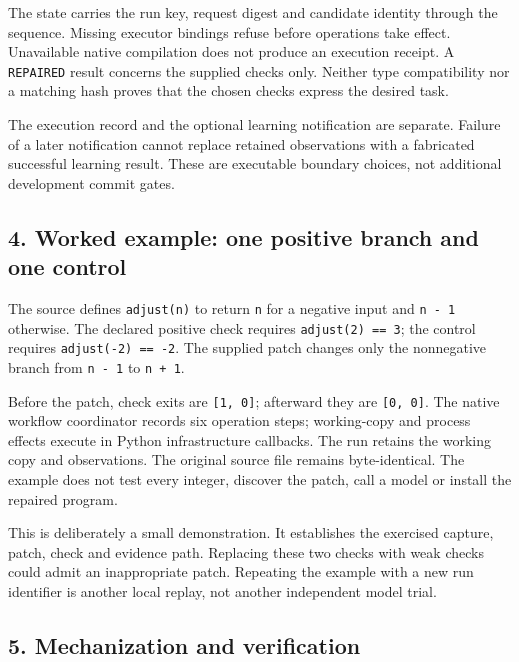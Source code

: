 \documentclass[
  11pt,
]{article}
\newcommand{\passthrough}[1]{#1}
\begin{document}
The state carries the run key, request digest and candidate identity
through the sequence. Missing executor bindings refuse before operations
take effect. Unavailable native compilation does not produce an
execution receipt. A \passthrough{\lstinline!REPAIRED!} result concerns
the supplied checks only. Neither type compatibility nor a matching hash
proves that the chosen checks express the desired task.

The execution record and the optional learning notification are
separate. Failure of a later notification cannot replace retained
observations with a fabricated successful learning result. These are
executable boundary choices, not additional development commit gates.

\subsection{4. Worked example: one positive branch and one
control}\label{worked-example-one-positive-branch-and-one-control}

The source defines \passthrough{\lstinline!adjust(n)!} to return
\passthrough{\lstinline!n!} for a negative input and
\passthrough{\lstinline!n - 1!} otherwise. The declared positive check
requires \passthrough{\lstinline!adjust(2) == 3!}; the control requires
\passthrough{\lstinline!adjust(-2) == -2!}. The supplied patch changes
only the nonnegative branch from \passthrough{\lstinline!n - 1!} to
\passthrough{\lstinline!n + 1!}.

Before the patch, check exits are \passthrough{\lstinline![1, 0]!};
afterward they are \passthrough{\lstinline![0, 0]!}. The native workflow
coordinator records six operation steps; working-copy and process
effects execute in Python infrastructure callbacks. The run retains the
working copy and observations. The original source file remains
byte-identical. The example does not test every integer, discover the
patch, call a model or install the repaired program.

This is deliberately a small demonstration. It establishes the exercised
capture, patch, check and evidence path. Replacing these two checks with
weak checks could admit an inappropriate patch. Repeating the example
with a new run identifier is another local replay, not another
independent model trial.

\subsection{5. Mechanization and
verification}\label{mechanization-and-verification}
\end{document}
